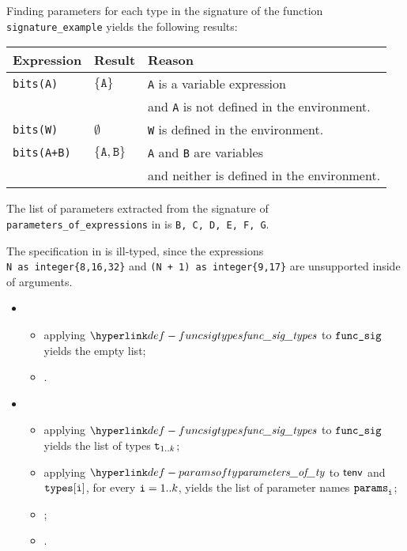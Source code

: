Finding parameters for each type in the signature of the function \texttt{signature\_example}
yields the following results:
\begin{center}
\begin{tabular}{lll}
\textbf{Expression} & \textbf{Result} & \textbf{Reason}\\
\hline
\texttt{bits(A)} & $\{\texttt{A}\}$ & \texttt{A} is a variable expression \\
& & and \texttt{A} is not defined in the environment.\\
\texttt{bits(W)} & $\emptyset$ & \texttt{W} is defined in the environment.\\
\texttt{bits(A+B)} & $\{\texttt{A}, \texttt{B}\}$ & \texttt{A} and \texttt{B} are variables \\
& & and neither is defined in the environment.\\
\end{tabular}
\end{center}

The list of parameters extracted from the signature of \verb|parameters_of_expressions|
in  is
\verb|B, C, D, E, F, G|.

The specification in  is ill-typed, since the
expressions \\
\verb|N as integer{8,16,32}| and \verb|(N + 1) as integer{9,17}|
are unsupported inside \bitvectortypesterm{} of arguments.

\ProseParagraph
\OneApplies
\begin{itemize}
  \item {}
  \begin{itemize}
    \item applying $\funcsigtypes$ to $\texttt{func\_sig}$ yields the empty list;
    \item {}.
  \end{itemize}

  \item {}
  \begin{itemize}
    \item applying $\funcsigtypes$ to $\texttt{func\_sig}$ yields the list of types $\texttt{t}_{1..k}$;
    \item applying $\paramsofty$ to $\textsf{tenv}$ and $\texttt{types}[\texttt{i}]$, for every $\texttt{i}=1..k$, yields the list of parameter names $\texttt{params}_{\texttt{i}}$\ProseOrTypeError;
    \item {};
    \item {}.
  \end{itemize}
\end{itemize}


